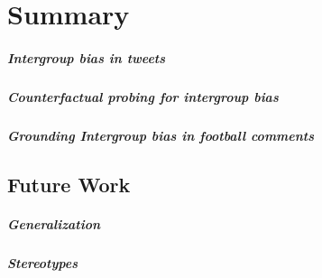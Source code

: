 \chapter{Summary}
\label{chapter:summary}



\paragraph{Intergroup bias in tweets}


\paragraph{Counterfactual probing for intergroup bias}


\paragraph{Grounding Intergroup bias in football comments}


\section{Future Work}


\paragraph{Generalization}


\paragraph{Stereotypes}


\paragraph{}
